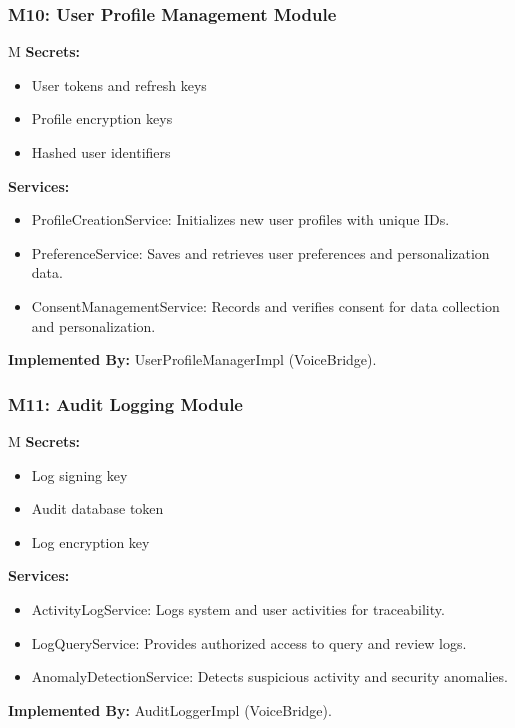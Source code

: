 \documentclass[12pt, titlepage]{article}
\newcounter{mnum}
\newcommand{\mthemnum}{M\themnum}
\begin{document}
\medskip
\subsubsection*{M10: User Profile Management Module} \mthemnum\label{m10}
\textbf{Secrets:}
\begin{itemize}
  \item User tokens and refresh keys
  \item Profile encryption keys
  \item Hashed user identifiers
\end{itemize}
\textbf{Services:}
\begin{itemize}
  \item ProfileCreationService: Initializes new user profiles with unique IDs.
  \item PreferenceService: Saves and retrieves user preferences and personalization data.
  \item ConsentManagementService: Records and verifies consent for data collection and personalization.
\end{itemize}
\textbf{Implemented By:} UserProfileManagerImpl (VoiceBridge).

\medskip
\subsubsection*{M11: Audit Logging Module} \mthemnum\label{m11}
\textbf{Secrets:}
\begin{itemize}
  \item Log signing key
  \item Audit database token
  \item Log encryption key
\end{itemize}
\textbf{Services:}
\begin{itemize}
  \item ActivityLogService: Logs system and user activities for traceability.
  \item LogQueryService: Provides authorized access to query and review logs.
  \item AnomalyDetectionService: Detects suspicious activity and security anomalies.
\end{itemize}
\textbf{Implemented By:} AuditLoggerImpl (VoiceBridge).

\medskip
\end{document}
